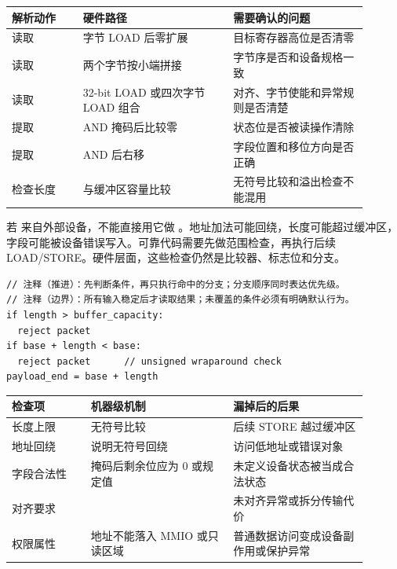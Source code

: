 \begin{longtable}{L{0.18\linewidth}L{0.38\linewidth}L{0.34\linewidth}}
\toprule
解析动作 & 硬件路径 & 需要确认的问题 \\
\midrule
读取  & 字节 LOAD 后零扩展 & 目标寄存器高位是否清零 \\\tablerowrule
读取  & 两个字节按小端拼接 & 字节序是否和设备规格一致 \\\tablerowrule
读取  & 32-bit LOAD 或四次字节 LOAD 组合 & 对齐、字节使能和异常规则是否清楚 \\\tablerowrule
提取  & AND 掩码后比较零 & 状态位是否被读操作清除 \\\tablerowrule
提取  & AND 后右移 & 字段位置和移位方向是否正确 \\\tablerowrule
检查长度 & 与缓冲区容量比较 & 无符号比较和溢出检查不能混用 \\
\bottomrule
\end{longtable}

若  来自外部设备，不能直接用它做 。地址加法可能回绕，长度可能超过缓冲区，字段可能被设备错误写入。可靠代码需要先做范围检查，再执行后续 LOAD/STORE。硬件层面，这些检查仍然是比较器、标志位和分支。

\begin{lstlisting}
// 注释（推进）：先判断条件，再只执行命中的分支；分支顺序同时表达优先级。
// 注释（边界）：所有输入稳定后才读取结果；未覆盖的条件必须有明确默认行为。
if length > buffer_capacity:
  reject packet
if base + length < base:
  reject packet      // unsigned wraparound check
payload_end = base + length
\end{lstlisting}

\begin{longtable}{L{0.2\linewidth}L{0.36\linewidth}L{0.34\linewidth}}
\toprule
检查项 & 机器级机制 & 漏掉后的后果 \\
\midrule
长度上限 & 无符号比较  & 后续 STORE 越过缓冲区 \\\tablerowrule
地址回绕 &  说明无符号回绕 & 访问低地址或错误对象 \\\tablerowrule
字段合法性 & 掩码后剩余位应为 0 或规定值 & 未定义设备状态被当成合法状态 \\\tablerowrule
对齐要求 &  & 未对齐异常或拆分传输代价 \\\tablerowrule
权限属性 & 地址不能落入 MMIO 或只读区域 & 普通数据访问变成设备副作用或保护异常 \\
\bottomrule
\end{longtable}

